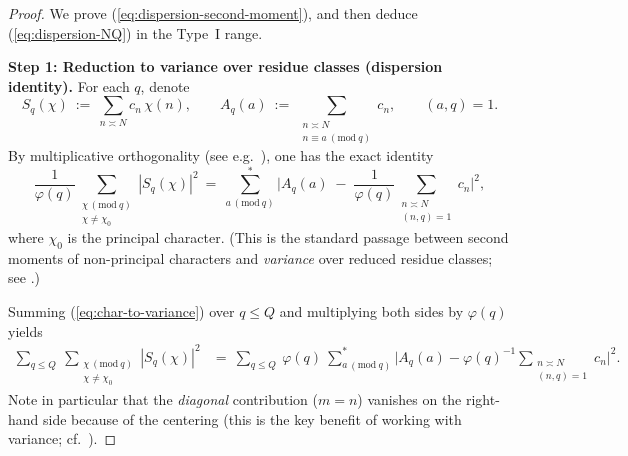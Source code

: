 \documentclass[11pt]{article}
\def\eqref#1{(\ref{#1})}%
\theoremstyle{definition}
\theoremstyle{remark}
\numberwithin{equation}{part}
\begin{document}
\begin{proof}
	We prove \eqref{eq:dispersion-second-moment}, and then deduce \eqref{eq:dispersion-NQ} in the Type~I range.

	\medskip
	\noindent\textbf{Step 1: Reduction to variance over residue classes (dispersion identity).}
	For each $q$, denote
	\[
		S_q(\chi)\ :=\ \sum_{n\asymp N} c_n\,\chi(n),\qquad
		A_q(a)\ :=\ \sum_{\substack{n\asymp N\\ n\equiv a\ (\mathrm{mod}\ q)}} c_n,\qquad (a,q)=1.
	\]
	By multiplicative orthogonality (see e.g.\ \cite[Ch.~12]{MontgomeryVaughan}), one has the exact identity
	\begin{equation}\label{eq:char-to-variance}
		\frac{1}{\varphi(q)}\sum_{\substack{\chi\,(\mathrm{mod}\ q)\\ \chi\ne\chi_0}} |S_q(\chi)|^2
		\ =\
		\sum_{a\,(\mathrm{mod}\ q)}^* \Big|A_q(a)\;-\;\frac{1}{\varphi(q)}\sum_{\substack{n\asymp N\\ (n,q)=1}} c_n\Big|^2,
	\end{equation}
	where $\chi_0$ is the principal character. (This is the standard passage between second moments of non-principal characters and \emph{variance} over reduced residue classes; see \cite[Eq.\ (12.48)]{MontgomeryVaughan}.)

	Summing \eqref{eq:char-to-variance} over $q\le Q$ and multiplying both sides by $\varphi(q)$ yields
	\begin{align}
		\sum_{q\le Q}\ \sum_{\substack{\chi\,(\mathrm{mod}\ q)                                                                  \\ \chi\ne\chi_0}} |S_q(\chi)|^2
		 & =\ \sum_{q\le Q}\ \varphi(q)\ \sum_{a\,(\mathrm{mod}\ q)}^* \Big|A_q(a)-\varphi(q)^{-1}\!\!\sum_{\substack{n\asymp N \\ (n,q)=1}} c_n\Big|^2.\label{eq:sum-variance}
	\end{align}
	Note in particular that the \emph{diagonal} contribution ($m=n$) vanishes on the right-hand side because of the centering (this is the key benefit of working with variance; cf.\ \cite[Ch.~28]{Davenport}).


\end{proof}
\end{document}
